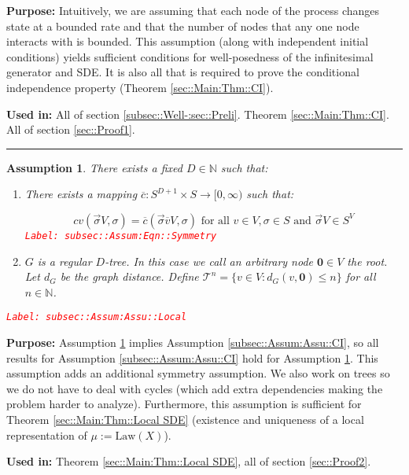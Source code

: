 \documentclass[12pt]{article}
\newcommand{\mb}{\mathbb}
\newcommand{\mc}{\mathcal}
\newcommand{\ra}{\rightarrow}
\newcommand{\ov}{\overline}
\newcommand{\te}{\text}
\newcommand{\tr}{\textcolor{red}}
\newcommand{\labe}[1]{\tr{\texttt{Label: #1}}}
\newcommand{\purpose}{\textbf{Purpose: }}
\newcommand{\usein}{\textbf{Used in: }}
\newcommand{\lin}{\rule{\linewidth}{0.4 pt}}
\newcommand{\defeq}{:=}								%
\renewcommand{\root}{\mathbf{0}}				%
\renewcommand{\v}{v}							%
\renewcommand{\S}{S}							%
\newcommand{\s}{\sigma}							%
\newcommand{\sv}{\vec{\s}}						%
\newcommand{\X}{X}								%
\newcommand{\IGr}{c}							%
\newcommand{\cl}{\ov}							%
\newcommand{\degr}{D}							%
\newcommand{\IGrg}{\ov{c}}						%
\newcommand{\gdist}{d_G}						%
\newcommand{\tree}{\mc{T}}						%
\newcommand{\m}{\mu}							%
\newcommand{\law}{\te{Law}}						%
\newtheorem{assu}[thms]{Assumption}
\begin{document}
\purpose Intuitively, we are assuming that each node of the process changes state at a bounded rate and that the number of nodes that any one node interacts with is bounded. This assumption (along with independent initial conditions) yields sufficient conditions for well-posedness of the infinitesimal generator and SDE. It is also all that is required to prove the conditional independence property (Theorem \ref{sec::Main:Thm::CI}). 

\usein All of section \ref{subsec::Well-:sec::Preli}. Theorem \ref{sec::Main:Thm::CI}. All of section \ref{sec::Proof1}.

\lin

\begin{assu}
There exists a fixed \(\degr\in \mb{N}\) such that:

\begin{enumerate}
\item There exists a mapping \(\IGrg: \S^{\degr+1} \times \S \ra [0,\infty)\) such that:

\begin{equation}
\IGr{\v}(\sv{}{ V},\s) = \IGrg(\sv{\cl{\v}}{ V},\s) \te{ for all } \v\in  V, \s\in \S\te{ and } \sv{}{ V} \in \S^ V
\label{subsec::Assum:Eqn::Symmetry}
\end{equation}
\labe{subsec::Assum:Eqn::Symmetry}

\item \(G\) is a regular \(\degr\)-tree. In this case we call an arbitrary node \(\root\in  V\) the root. Let \(\gdist\) be the graph distance. Define \(\tree^n = \{\v \in  V: \gdist(\v,\root) \leq n\}\) for all \(n\in \mb{N}\).
\end{enumerate}
\label{subsec::Assum:Assu::Local}\labe{subsec::Assum:Assu::Local}
\end{assu}

\purpose Assumption \ref{subsec::Assum:Assu::Local} implies Assumption \ref{subsec::Assum:Assu::CI}, so all results for Assumption \ref{subsec::Assum:Assu::CI} hold for Assumption \ref{subsec::Assum:Assu::Local}. This assumption adds an additional symmetry assumption. We also work on trees so we do not have to deal with cycles (which add extra dependencies making the problem harder to analyze). Furthermore, this assumption is sufficient for Theorem \ref{sec::Main:Thm::Local SDE} (existence and uniqueness of a local representation of \(\m{}{}{} \defeq \law(\X{}{})\)).

\usein Theorem \ref{sec::Main:Thm::Local SDE}, all of section \ref{sec::Proof2}.
\end{document}
